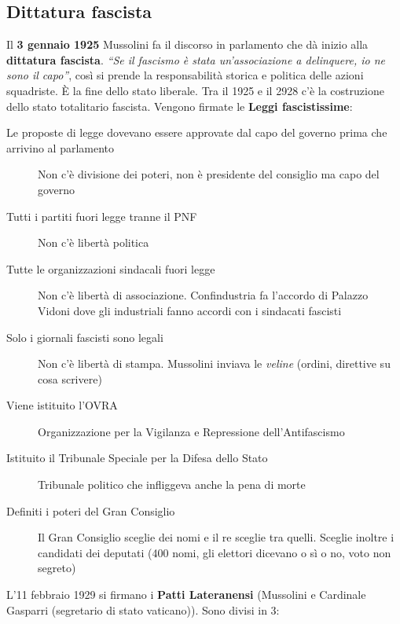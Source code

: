 \subsection{Dittatura fascista}
Il \textbf{3 gennaio 1925} Mussolini fa il discorso in parlamento che dà inizio alla 
\textbf{dittatura fascista}. \textit{``Se il fascismo è stata un'associazione a delinquere, io ne
sono il capo''}, così si prende la responsabilità storica e politica delle azioni squadriste. È la
fine dello stato liberale. Tra il 1925 e il 2928 c'è la costruzione dello stato totalitario fascista.
Vengono firmate le \textbf{Leggi fascistissime}:
\begin{description}
  \item[Le proposte di legge dovevano essere approvate dal capo del governo prima che arrivino al
    parlamento] Non c'è divisione dei poteri, non è presidente del consiglio ma capo del governo
  \item[Tutti i partiti fuori legge tranne il PNF] Non c'è libertà politica
  \item[Tutte le organizzazioni sindacali fuori legge] Non c'è libertà di associazione. Confindustria
    fa l'accordo di Palazzo Vidoni dove gli industriali fanno accordi con i sindacati fascisti
  \item[Solo i giornali fascisti sono legali] Non c'è libertà di stampa. Mussolini inviava le
    \textit{veline} (ordini, direttive su cosa scrivere)
  \item[Viene istituito l'OVRA] Organizzazione per la Vigilanza e Repressione dell'Antifascismo
  \item[Istituito il Tribunale Speciale per la Difesa dello Stato] Tribunale politico che infliggeva
    anche la pena di morte
  \item[Definiti i poteri del Gran Consiglio] Il Gran Consiglio sceglie dei nomi e il re sceglie tra
    quelli. Sceglie inoltre i candidati dei deputati (400 nomi, gli elettori dicevano o sì o no, voto
    non segreto)
\end{description}
L'11 febbraio 1929 si firmano i \textbf{Patti Lateranensi} (Mussolini e Cardinale Gasparri 
(segretario di stato vaticano)). Sono divisi in 3:
